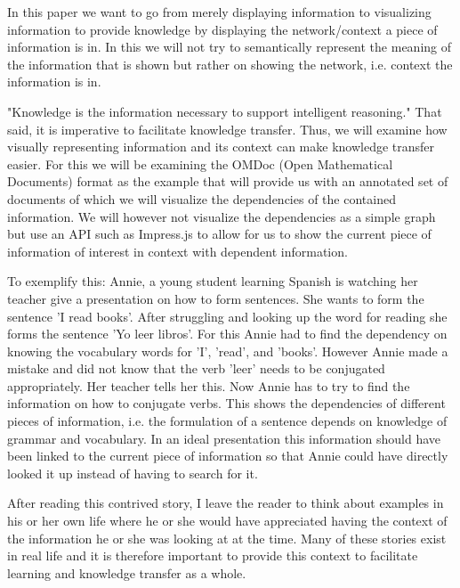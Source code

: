 \documentclass[twoside]{article}
\begin{document}
In this paper we want to go from merely displaying information to visualizing information to provide knowledge by displaying the network/context a piece of information is in. In this we will not try to semantically represent the meaning of the information that is shown but rather on showing the network, i.e. context the information is in.


"Knowledge is the information necessary to support intelligent reasoning." \cite{Kohlhase} That said, it is imperative to facilitate knowledge transfer.  Thus, we will examine how visually representing information and its context can make knowledge transfer easier. For this we will be examining the OMDoc (Open Mathematical Documents) format as the example that will provide us with an annotated set of documents of which we will visualize the dependencies of the contained information. We will however not visualize the dependencies as a simple graph but use an API such as Impress.js to allow for us to show the current piece of information of interest in context with dependent information.

To exemplify this: Annie, a young student learning Spanish is watching her teacher give a presentation on how to form sentences. She wants to form the sentence 'I read books'. After struggling and looking up the word for reading she forms the sentence 'Yo leer libros'. For this Annie had to find the dependency on knowing the vocabulary words for 'I', 'read', and 'books'. However Annie made a mistake and did not know that the verb 'leer' needs to be conjugated appropriately. Her teacher tells her this. Now Annie has to try to find the information on how to conjugate verbs. This shows the dependencies of different pieces of information, i.e. the formulation of a sentence depends on knowledge of grammar and vocabulary. In an ideal presentation this information should have been linked to the current piece of information so that Annie could have directly looked it up instead of having to search for it.

After reading this contrived story, I leave the reader to think about examples in his or her own life where he or she would have appreciated having the context of the information he or she was looking at at the time. Many of these stories exist in real life and it is therefore important to provide this context to facilitate learning and knowledge transfer as a whole. 
\end{document}
